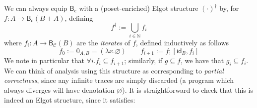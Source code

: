 \documentclass[acmsmall,screen,anonymous,review]{acmart}
\newcommand{\mc}[1]{\ensuremath{\mathcal{#1}}}
\newcommand{\ms}[1]{\ensuremath{\mathsf{#1}}}
\newcommand{\nats}{\mathbb{N}}
\begin{document}
We can always equip $\ms{B}_{\ms{c}}$ with a (poset-enriched) Elgot structure $(\cdot)^\dagger$ by,
for $f: A \to \ms{B}_{\ms{c}}(B + A)$, defining
\begin{equation*}
  f^\dagger := \bigcup_{i \in \nats}f_i
\end{equation*}
where $f_i : A \to \ms{B}_{\mc{C}}(B)$ are the \emph{iterates} of $f$, defined inductively as
follows
\begin{equation*}
  f_0 := 0_{A, B} = (\lambda x . \varnothing) \qquad
  f_{i + 1} := f ; [\ms{id}_B, f_{i}]
\end{equation*}
We note in particular that $\forall i . f_i \subseteq f_{i + 1}$; similarly, if $g \subseteq f$, we
have that $g_i \subseteq f_i$. We can think of analysis using this structure as corresponding to
\emph{partial correctness}, since any infinite traces are simply discarded (a program which always
diverges will have denotation $\varnothing$). It is straightforward to check that this is indeed an
Elgot structure, since it satisfies:
\end{document}
